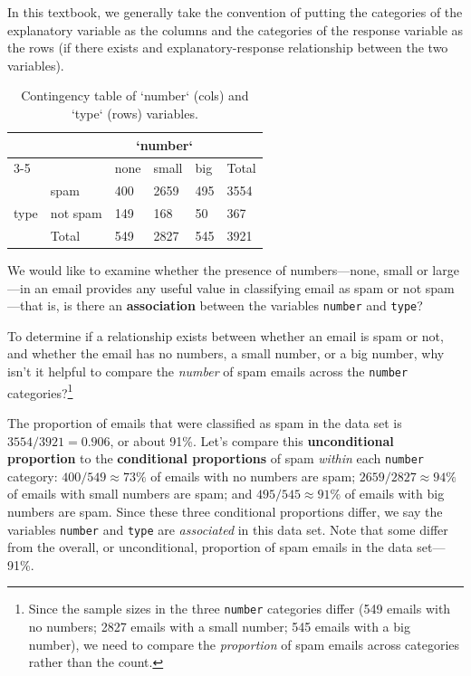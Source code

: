 \documentclass[
  10pt,
  openany]{book}
\theoremstyle{definition}
\theoremstyle{definition}
\theoremstyle{definition}
\theoremstyle{definition}
\theoremstyle{remark}
\begin{document}
In this textbook, we generally take the convention of putting the categories of the explanatory variable as the columns and the categories of the response variable as the rows (if there exists and explanatory-response relationship between the two variables).

\begin{table}
\centering
\caption{\label{tab:emailTable}Contingency table of `number` (cols) and `type` (rows) variables.}
\centering
\begin{tabular}[t]{l|l|l|l|l|l}
\hline
\multicolumn{1}{c|}{ } & \multicolumn{1}{c|}{ } & \multicolumn{3}{c|}{`number`} & \multicolumn{1}{c}{ } \\
\cline{3-5}
 &  & none & small & big & Total\\
\hline
 & spam & 400 & 2659 & 495 & 3554\\
\hline
type & not spam & 149 & 168 & 50 & 367\\
\hline
 & Total & 549 & 2827 & 545 & 3921\\
\hline
\end{tabular}
\end{table}

We would like to examine whether the presence of numbers---none, small or large---in an email provides any useful value in classifying email as spam or not spam---that is, is there an \textbf{association} between the variables \texttt{number} and \texttt{type}?

To determine if a relationship exists between whether an email is spam or not, and whether the email has no numbers, a small number, or a big number, why isn't it helpful to compare the \emph{number} of spam emails across the \texttt{number} categories?\footnote{Since the sample sizes in the three \texttt{number} categories differ (549 emails with no numbers; 2827 emails with a small number; 545 emails with a big number), we need to compare the \emph{proportion} of spam emails across categories rather than the count.}

The proportion of emails that were classified as spam in the data set is \(3554/3921 = 0.906\), or about 91\%. Let's compare this \textbf{unconditional proportion} to the \textbf{conditional proportions} of spam \emph{within} each \texttt{number} category: \(400/549 \approx 73\%\) of emails with no numbers are spam; \(2659/2827 \approx 94\%\) of emails with small numbers are spam; and \(495/545 \approx 91\%\) of emails with big numbers are spam. Since these three conditional proportions differ, we say the variables \texttt{number} and \texttt{type} are \emph{associated} in this data set. Note that some differ from the overall, or unconditional, proportion of spam emails in the data set---91\%.
\end{document}
